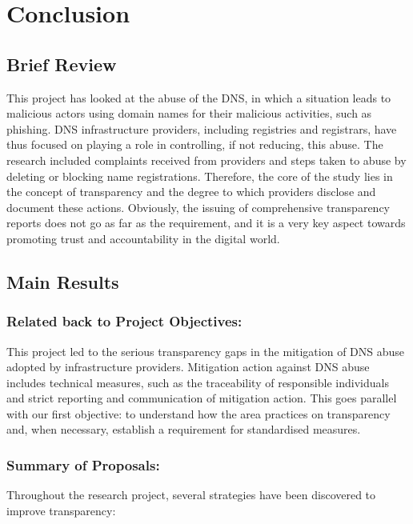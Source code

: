 \chapter{Conclusion}

\section{Brief Review}

This project has looked at the abuse of the DNS, in which a situation leads to malicious actors using domain names for their malicious activities, such as phishing. DNS infrastructure providers, including registries and registrars, have thus focused on playing a role in controlling, if not reducing, this abuse. The research included complaints received from providers and steps taken to abuse by deleting or blocking name registrations. Therefore, the core of the study lies in the concept of transparency and the degree to which providers disclose and document these actions. Obviously, the issuing of comprehensive transparency reports does not go as far as the requirement, and it is a very key aspect towards promoting trust and accountability in the digital world. 


\section{Main Results}

\subsection{Related back to Project Objectives:}

This project led to the serious transparency gaps in the mitigation of DNS abuse adopted by infrastructure providers. Mitigation action against DNS abuse includes technical measures, such as the traceability of responsible individuals and strict reporting and communication of mitigation action. This goes parallel with our first objective: to understand how the area practices on transparency and, when necessary, establish a requirement for standardised measures.

\subsection{Summary of Proposals:}

Throughout the research project, several strategies have been discovered to improve transparency:


